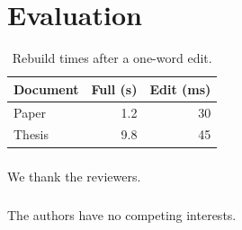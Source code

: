 \documentclass[runningheads]{llncs}
\begin{document}
\section{Evaluation}
\begin{table}
\caption{Rebuild times after a one-word edit.}\label{tab:res}
\centering
\begin{tabular}{lrr}
\toprule
Document & Full (s) & Edit (ms) \\
\midrule
Paper & 1.2 & 30 \\
Thesis & 9.8 & 45 \\
\bottomrule
\end{tabular}
\end{table}
\begin{credits}
\subsubsection{\ackname} We thank the reviewers.
\subsubsection{\discintname} The authors have no competing interests.
\end{credits}


\end{document}
